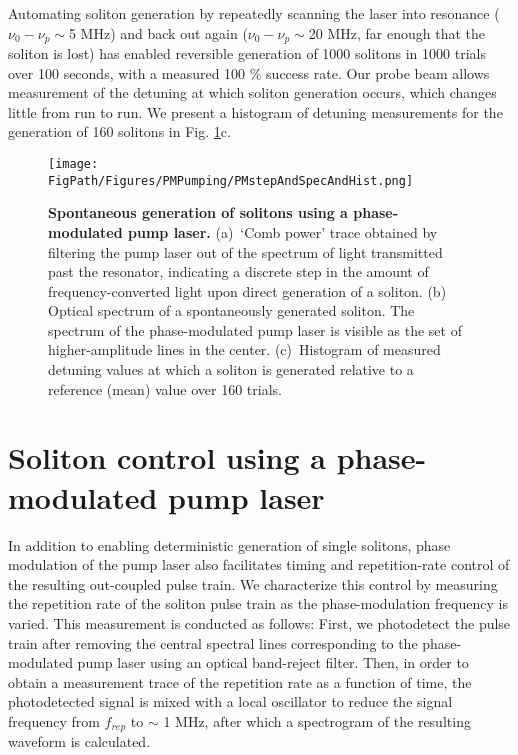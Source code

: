 Automating soliton generation by repeatedly scanning the laser into resonance ($\nu_0-\nu_{p}\sim$5 MHz) and back out again ($\nu_0-\nu_{p}\sim$20 MHz, far enough that the soliton is lost) has enabled reversible generation of 1000 solitons in 1000 trials over 100 seconds, with a measured 100 $\%$ success rate. Our probe beam allows measurement of the detuning at which soliton generation occurs, which changes little from run to run. We present a histogram of detuning measurements for the generation of 160 solitons in Fig. \ref{fig:PMgen}c. 

\begin{figure}[htpb]
	\begin{center}
		\texttt{[image: \\FigPath/Figures/PMPumping/PMstepAndSpecAndHist.png]}
	\end{center}
	\caption[Spontaneous generation of solitons using a phase-modulated pump laser]{\textbf{Spontaneous generation of solitons using a phase-modulated pump laser.} (a)~`Comb power' trace obtained by filtering the pump laser out of the spectrum of light transmitted past the resonator, indicating a discrete step in the amount of frequency-converted light upon direct generation of a soliton. (b) Optical spectrum of a spontaneously generated soliton. The spectrum of the phase-modulated pump laser is visible as the set of higher-amplitude lines in the center. (c)~Histogram of measured detuning values at which a soliton is generated relative to a reference (mean) value over 160 trials.}
	\label{fig:PMgen}
\end{figure} 

\section{Soliton control using a phase-modulated pump laser}

In addition to enabling deterministic generation of single solitons, phase modulation of the pump laser also facilitates timing and repetition-rate control of the resulting out-coupled pulse train. We characterize this control by measuring the repetition rate of the soliton pulse train as the phase-modulation frequency is varied. This measurement is conducted as follows: First, we photodetect the pulse train after removing the central spectral lines corresponding to the phase-modulated pump laser using an optical band-reject filter. Then, in order to obtain a measurement trace of the repetition rate as a function of time, the photodetected signal is mixed with a local oscillator to reduce the signal frequency from $f_{rep}$ to $\sim$ 1 MHz, after which a spectrogram of the resulting waveform is calculated.

